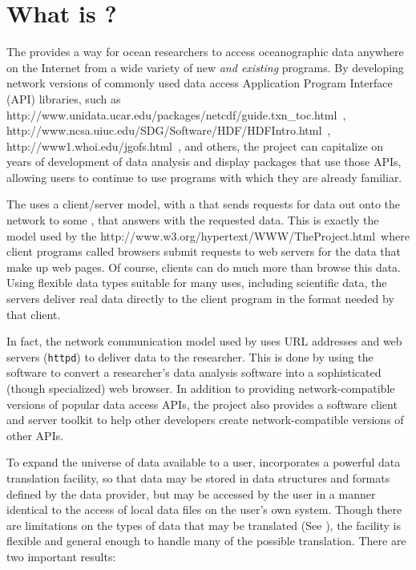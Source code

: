 %
%

\chapter{What is \opendap?}
\label{intro,opd}

The \opendap provides a way for ocean researchers to
access oceanographic data anywhere on the Internet from a wide variety of new
\emph{and existing} programs. By developing network versions of commonly used
data access Application Program Interface (API) libraries, such as
{http://www.unidata.ucar.edu/packages/netcdf/guide.txn_toc.html}\ ,
{http://www.ncsa.uiuc.edu/SDG/Software/HDF/HDFIntro.html}\ ,
 {http://www1.whoi.edu/jgofs.html}\ , and others,
the \opendap project can capitalize on years of development of data analysis and
display packages that use those APIs, allowing users to continue to use
programs with which they are already familiar.

The \opendap {} uses a client/server model, with a {\em
  {}} that sends requests for data out onto the network to some
{\em {}}, that answers with the requested data. This is exactly
the model used by the 
{http://www.w3.org/hypertext/WWW/TheProject.html}\ where client programs
called browsers submit requests to web servers for the data that make up web
pages. Of course, \opendap clients can do much more than browse this data.  Using
flexible data types suitable for many uses, including scientific data, the
\opendap servers deliver real data directly to the client program in the format
needed by that client.

In fact, the network communication model used by \opendap uses URL
addresses and web servers ({\tt httpd}) to deliver data to the
researcher.  This is done by using the \opendap software to convert a
researcher's data analysis software into a sophisticated (though
specialized) web browser. In addition to providing network-compatible
versions of popular data access APIs, the \opendap project also
provides a software client and server toolkit to help other developers
create network-compatible \opendap versions of other APIs.

To expand the universe of data available to a user, \opendap incorporates
a powerful data translation facility, so that data may be stored in
data structures and formats defined by the data provider, but may be
accessed by the user in a manner identical to the access of local data
files on the user's own system. Though there are limitations on the
types of data that may be translated (See ),
the facility is flexible and general enough to handle many of the
possible translation.  There are two important results:

